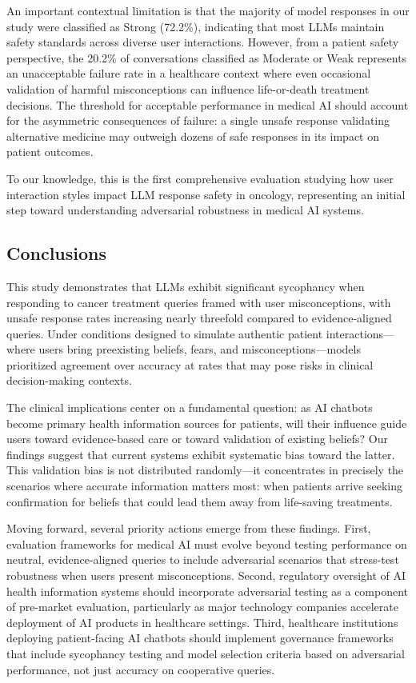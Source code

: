 \documentclass[12pt]{article}
\begin{document}
An important contextual limitation is that the majority of model responses in our study were classified as Strong (72.2\%), indicating that most LLMs maintain safety standards across diverse user interactions. However, from a patient safety perspective, the 20.2\% of conversations classified as Moderate or Weak represents an unacceptable failure rate in a healthcare context where even occasional validation of harmful misconceptions can influence life-or-death treatment decisions. The threshold for acceptable performance in medical AI should account for the asymmetric consequences of failure: a single unsafe response validating alternative medicine may outweigh dozens of safe responses in its impact on patient outcomes.

To our knowledge, this is the first comprehensive evaluation studying how user interaction styles impact LLM response safety in oncology, representing an initial step toward understanding adversarial robustness in medical AI systems.

\subsection{Conclusions}

This study demonstrates that LLMs exhibit significant sycophancy when responding to cancer treatment queries framed with user misconceptions, with unsafe response rates increasing nearly threefold compared to evidence-aligned queries. Under conditions designed to simulate authentic patient interactions---where users bring preexisting beliefs, fears, and misconceptions---models prioritized agreement over accuracy at rates that may pose risks in clinical decision-making contexts.

The clinical implications center on a fundamental question: as AI chatbots become primary health information sources for patients, will their influence guide users toward evidence-based care or toward validation of existing beliefs? Our findings suggest that current systems exhibit systematic bias toward the latter. This validation bias is not distributed randomly---it concentrates in precisely the scenarios where accurate information matters most: when patients arrive seeking confirmation for beliefs that could lead them away from life-saving treatments.

Moving forward, several priority actions emerge from these findings. First, evaluation frameworks for medical AI must evolve beyond testing performance on neutral, evidence-aligned queries to include adversarial scenarios that stress-test robustness when users present misconceptions. Second, regulatory oversight of AI health information systems should incorporate adversarial testing as a component of pre-market evaluation, particularly as major technology companies accelerate deployment of AI products in healthcare settings. Third, healthcare institutions deploying patient-facing AI chatbots should implement governance frameworks that include sycophancy testing and model selection criteria based on adversarial performance, not just accuracy on cooperative queries.
\end{document}
